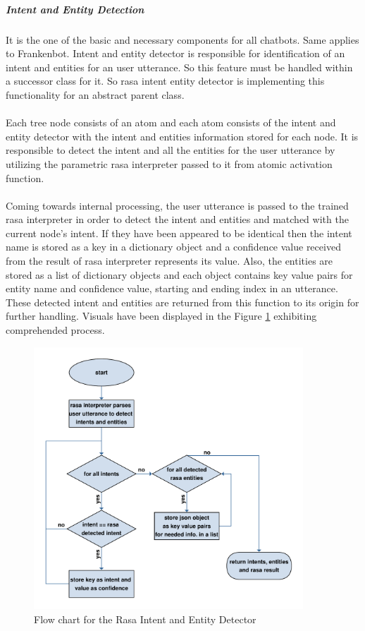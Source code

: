 \subparagraph*{Intent and Entity Detection}
It is the one of the basic and necessary components for all chatbots. Same applies to Frankenbot. Intent and entity detector is responsible for identification of an intent and entities for an user utterance. So this feature must be handled within a successor class for it. So rasa intent entity detector is implementing this functionality for an abstract parent class.
\\~\\
Each tree node consists of an atom and each atom consists of the intent and entity detector with the intent and entities information stored for each node. It is responsible to detect the intent and all the entities for the user utterance by utilizing the parametric rasa interpreter passed to it from atomic activation function.
\\~\\
Coming towards internal processing, the user utterance is passed to the trained rasa interpreter in order to detect the intent and entities and matched with the current node's intent. If they have been appeared to be identical then the intent name is stored as a key in a dictionary object and a confidence value received from the result of rasa interpreter represents its value. Also, the entities are stored as a list of dictionary objects and each object contains key value pairs for entity name and confidence value, starting and ending index in an utterance. These detected intent and entities are returned from this function to its origin for further handling. Visuals have been displayed in the Figure \ref{fig:flowIntandEnt} exhibiting comprehended process.

\begin{figure}[!h]
    \centering
    \includegraphics[width=0.9\textwidth]{img/Intent_entity_detector.pdf}
    \caption{Flow chart for the Rasa Intent and Entity Detector}
    \label{fig:flowIntandEnt}
\end{figure}

